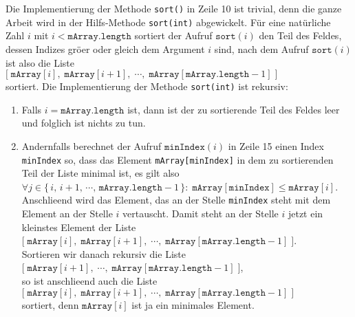 Die Implementierung der Methode \texttt{sort()} in Zeile 10 ist trivial, denn die ganze
Arbeit wird in der Hilfs-Methode \texttt{sort(int)} abgewickelt.  F\"ur eine 
nat\"urliche Zahl $i$ mit $i < \mathtt{mArray.length}$ sortiert der Aufruf 
 $\texttt{sort}(i)$ 
den Teil des Feldes, dessen Indizes gr\"o\3er oder gleich dem Argument $i$ sind, nach dem
Aufruf $\mathtt{sort}(i)$ ist also die Liste \\[0.1cm]
\hspace*{1.3cm} 
$\bigl[\;\mathtt{mArray}[i],\;\mathtt{mArray}[i+1],\;\cdots,\;\mathtt{mArray}[\mathtt{mArray.length}-1] \;\bigr]$
\\[0.1cm]
sortiert.  Die Implementierung der Methode \texttt{sort(int)} ist rekursiv:
\begin{enumerate}
\item Falls $i = \mathtt{mArray.length}$ ist, dann ist der zu sortierende Teil des 
      Feldes leer und folglich ist nichts zu tun.
\item Andernfalls berechnet der Aufruf $\texttt{minIndex}(i)$ in Zeile 15 einen Index
      \texttt{minIndex} so, dass das Element \texttt{mArray[minIndex]} in dem zu
      sortierenden Teil der Liste minimal ist, es gilt also \\[0.1cm]
      \hspace*{1.3cm} 
      $\forall j \in \bigl\{\, i,\, i+1,\, \cdots,\, \texttt{mArray.length} -1\, \} \colon\;
       \texttt{mArray}[\texttt{minIndex}] \leq \texttt{mArray}[i]$. \\[0.1cm]
      Anschlie\3end wird das Element, das an der Stelle \texttt{minIndex} steht mit dem
      Element an der Stelle $i$ vertauscht.  Damit steht an der Stelle $i$ jetzt ein
      kleinstes Element der Liste \\[0.1cm]
      \hspace*{1.3cm} $\bigl[\;\mathtt{mArray}[i],\;\mathtt{mArray}[i+1],\;\cdots,\;\mathtt{mArray}[\mathtt{mArray.length}-1] \;\bigr]$.
      \\[0.1cm]
      Sortieren wir danach rekursiv die Liste \\[0.1cm]
      \hspace*{1.3cm} $\bigl[\;\mathtt{mArray}[i+1],\;\cdots,\;\mathtt{mArray}[\mathtt{mArray.length}-1] \;\bigr]$,
      \\[0.1cm]
      so ist anschlie\3end auch die Liste \\[0.1cm]
      \hspace*{1.3cm}
      $\bigl[\;\mathtt{mArray}[i],\;\mathtt{mArray}[i+1],\;\cdots,\;\mathtt{mArray}[\mathtt{mArray.length}-1] \;\bigr]$
      \\[0.1cm]
      sortiert, denn $\texttt{mArray}[i]$ ist ja ein minimales Element.
\end{enumerate}
